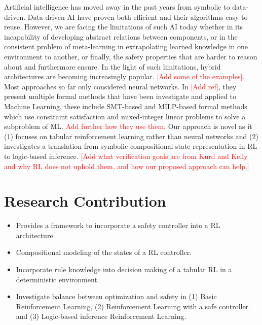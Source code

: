\documentclass[a4paper,11pt]{article}
\begin{document}
Artificial intelligence has moved away in the past years from symbolic to data-driven. 
Data-driven AI have proven both efficient and their algorithms easy to reuse. However, 
we are facing the limitations of such AI today whether 
in its incapability of developing abstract relations between components, or in the consistent problem of meta-learning in extrapolating learned knowledge 
in one environment to another, or finally, the safety properties that are harder to reason about and furthermore ensure. 
In the light of such limitations, hybrid architectures are becoming increasingly popular. \textcolor{red}{[Add some of the examples]}. 
\newline 
Most approaches so far only considered neural networks. In \textcolor{red}{[Add ref]}, they present multiple formal methods that have been investigate 
and applied to Machine Learning, these include SMT-based and MILP-based formal methods which use constraint satisfaction and mixed-integer linear problems to solve a subproblem of ML. \textcolor{red}{Add further how they use them.}
Our approach is novel as it (1) focuses on tabular reinforcement learning rather than neural networks and (2) investigates a translation from  
symbolic compositional state representation in RL to logic-based inference. \newline 
\textcolor{red}{[Add what verification goals are from Kurd and Kelly and why RL does not uphold them, and how our proposed approach can help.]}

\section{Research Contribution}
\begin{itemize}
    \item Provides a framework to incorporate a safety controller into a RL architecture. 
    \item Compositional modeling of the states of a RL controller. 
    \item Incorporate rule knowledge into decision making of a tabular RL in a deterministic environment. 
    \item Investigate balance between optimization and safety in (1) Basic Reinforcement Learning, (2) Reinforcement Learning with a safe controller and (3) Logic-based inference Reinforcement Learning.
\end{itemize}
\end{document}
